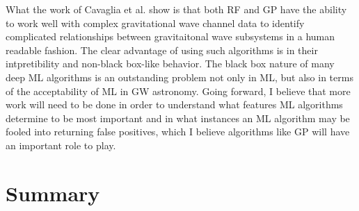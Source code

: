 %

What the work of Cavaglia et al. show is that both \ac{RF} and \ac{GP} have the ability to work well with complex gravitational wave channel data to identify complicated relationships between gravitaitonal wave subsystems in a human readable fashion. The clear advantage of using such algorithms is in their intpretibility and non-black box-like behavior. The black box nature of many deep \ac{ML} algorithms is an outstanding problem not only in \ac{ML}, but also in terms of the acceptability of \ac{ML} in \ac{GW} astronomy. Going forward, I believe that more work will need to be done in order to understand what features \ac{ML} algorithms determine to be most important and in what instances an \ac{ML} algorithm may be fooled into returning false positives, which I believe algorithms like \ac{GP} will have an important role to play.

\section{Summary}

